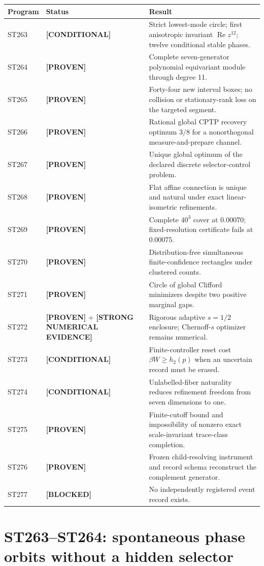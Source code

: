 \documentclass[11pt,a4paper]{article}
\newcommand{\Proven}{\textcolor{proved}{\textbf{[PROVEN]}}}
\newcommand{\Evidence}{\textcolor{conditional}{\textbf{[STRONG NUMERICAL EVIDENCE]}}}
\newcommand{\Conditional}{\textcolor{conditional}{\textbf{[CONDITIONAL]}}}
\newcommand{\Blocked}{\textcolor{blocked}{\textbf{[BLOCKED]}}}
\begin{document}
\small
\begin{longtable}{p{}p{}p{}}
\toprule
Program & Status & Result \\
\midrule\endhead
ST263 & \Conditional & Strict lowest-mode circle; first anisotropic invariant
$\operatorname{Re}z^{12}$; twelve conditional stable phases. \\
ST264 & \Proven & Complete seven-generator polynomial equivariant module through degree 11. \\
ST265 & \Proven & Forty-four new interval boxes; no collision or stationary-rank loss on the targeted segment. \\
ST266 & \Proven & Rational global CPTP recovery optimum $3/8$ for a nonorthogonal measure-and-prepare channel. \\
ST267 & \Proven & Unique global optimum of the declared discrete selector-control problem. \\
ST268 & \Proven & Flat affine connection is unique and natural under exact linear-isometric refinements. \\
ST269 & \Proven & Complete $40^3$ cover at $0.00070$; fixed-resolution certificate fails at $0.00075$. \\
ST270 & \Proven & Distribution-free simultaneous finite-confidence rectangles under clustered counts. \\
ST271 & \Proven & Circle of global Clifford minimizers despite two positive marginal gaps. \\
ST272 & \Proven{} + \Evidence & Rigorous adaptive $s=1/2$ enclosure; Chernoff-$s$ optimizer remains numerical. \\
ST273 & \Conditional & Finite-controller reset cost $\beta W\ge h_2(p)$ when an uncertain record must be erased. \\
ST274 & \Conditional & Unlabelled-fiber naturality reduces refinement freedom from seven dimensions to one. \\
ST275 & \Proven & Finite-cutoff bound and impossibility of nonzero exact scale-invariant trace-class completion. \\
ST276 & \Proven & Frozen child-resolving instrument and record schema reconstruct the complement generator. \\
ST277 & \Blocked & No independently registered event record exists. \\
\bottomrule
\end{longtable}
\normalsize

\section{ST263--ST264: spontaneous phase orbits without a hidden selector}
\end{document}
